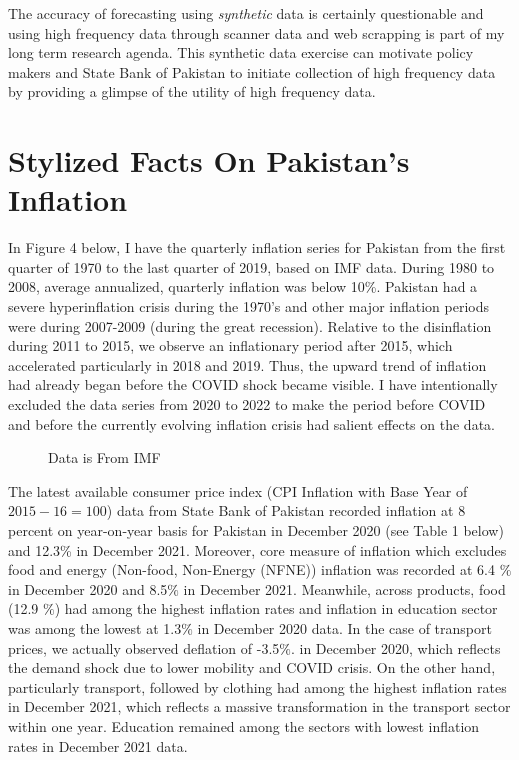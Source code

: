 \documentclass[12pt]{article}
\newcommand{\1}{\mathbbm 1}
\begin{document}
		The accuracy of forecasting using \textit{synthetic} data is certainly questionable and using high frequency data through scanner data and web scrapping is part of my long term research agenda. This synthetic data exercise can motivate policy makers and State Bank of Pakistan to initiate collection of high frequency data by providing a glimpse of the utility of high frequency data.
		
		
		
		
		
		
		
		
		
		
		
		
		\section{Stylized Facts On Pakistan's Inflation}
		
		In Figure 4 below, I have the quarterly inflation series for Pakistan from the first quarter of 1970 to the last quarter of 2019, based on IMF data. During 1980 to 2008, average annualized, quarterly inflation was below 10\%. Pakistan had a severe hyperinflation crisis during the 1970's and other major inflation periods were during 2007-2009 (during the great recession). Relative to the disinflation during 2011 to 2015, we observe an inflationary period after 2015, which accelerated particularly in 2018 and 2019. Thus, the upward trend of inflation had already began before the COVID shock became visible. I have intentionally excluded the data series from 2020 to 2022 to make the period before COVID and before the currently evolving inflation crisis had salient effects on the data.
		
		
		
		
		
		
		
		
		\begin{figure}[H]
			\centering
			\scalebox{0.6}{}
			\hfill
			\caption{Data is From IMF}
		\end{figure}
		
		
		
		
		
		The latest available consumer price index (CPI Inflation with Base Year of $2015-16 =100$) data from State Bank of Pakistan recorded inflation at 8 percent on year-on-year basis for Pakistan in December 2020 (see Table 1 below) and 12.3\% in December 2021. Moreover, core measure of inflation which excludes food and energy (Non-food, Non-Energy (NFNE)) inflation was recorded at 6.4 $\%$ in December 2020 and 8.5$\%$ in December 2021. Meanwhile, across products, food (12.9 $\%$) had among the highest inflation rates and inflation in education sector was among the lowest at 1.3$\%$ in December 2020 data. In the case of transport prices, we actually observed deflation of -3.5$\%$. in December 2020, which reflects the demand shock due to lower mobility and COVID crisis. On the other hand, particularly transport, followed by clothing had among the highest inflation rates in December 2021, which reflects a massive transformation in the transport sector within one year. Education remained among the sectors with lowest inflation rates in December 2021 data.
		
\end{document}
